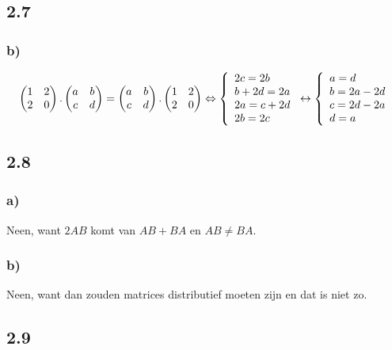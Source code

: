 \documentclass[11pt]{article}
\begin{document}
\subsection*{2.7}
\subsubsection*{b)}
\[
\begin{pmatrix}
1 & 2 \\
2 & 0
\end{pmatrix}
.
\begin{pmatrix}
a & b \\
c & d
\end{pmatrix}
=
\begin{pmatrix}
a & b \\
c & d
\end{pmatrix}
.
\begin{pmatrix}
1 & 2 \\
2 & 0
\end{pmatrix}
\Leftrightarrow
\left\lbrace
\begin{array}{l l}
2c=2b\\
b+2d=2a\\
2a=c+2d\\
2b=2c
\end{array}
\right.
\leftrightarrow
\left\lbrace
\begin{array}{l l}
a=d\\
b=2a-2d\\
c=2d-2a\\
d=a
\end{array}
\right.
\]
\subsection*{2.8}
\subsubsection*{a)}
Neen, want $2AB$ komt van $AB+BA$ en $AB \neq BA$.
\subsubsection*{b)}
Neen, want dan zouden matrices distributief moeten zijn en dat is niet zo.

\subsection*{2.9}
\end{document}
